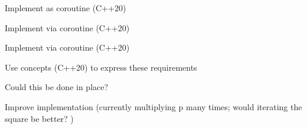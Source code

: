 
\begin{DoxyRefList}
\item[Class \mbox{\hyperlink{classsymmp_1_1FactoryGenerator}{Factory\+Generator$<$ spec\+\_\+t, gen\+\_\+t $>$}} ]\label{todo__todo000001}%
%
Implement as coroutine (C++20)  
\item[Class \mbox{\hyperlink{classsymmp_1_1PermutationGenerator}{Permutation\+Generator$<$ T $>$}} ]\label{todo__todo000002}%
%
Implement via coroutine (C++20)  
\item[Class \mbox{\hyperlink{classsymmp_1_1CombinationGenerator}{Combination\+Generator$<$ T $>$}} ]\label{todo__todo000003}%
%
Implement via coroutine (C++20)  
\item[Class \mbox{\hyperlink{classsymmp_1_1Polynomial}{Polynomial$<$ \+\_\+scl, \+\_\+exp, \+\_\+container, container\+\_\+is\+\_\+ordered, \+\_\+\+Args $>$}} ]\label{todo__todo000004}%
%
Use concepts (C++20) to express these requirements  
\item[Member \mbox{\hyperlink{classsymmp_1_1Polynomial_aa19a420790fbe79b9b73b503bf37bece}{Polynomial$<$ \+\_\+scl, \+\_\+exp, \+\_\+container, container\+\_\+is\+\_\+ordered, \+\_\+\+Args $>$\+::operator$\ast$=}} (const \mbox{\hyperlink{classsymmp_1_1Polynomial}{Polynomial}} \&other) -\/$>$ \mbox{\hyperlink{classsymmp_1_1Polynomial}{Polynomial}} \&]\label{todo__todo000005}%
%
Could this be done in place?  
\item[Member \mbox{\hyperlink{classsymmp_1_1Polynomial_a39143ef3ebb433a42659875d3b955daf}{Polynomial$<$ \+\_\+scl, \+\_\+exp, \+\_\+container, container\+\_\+is\+\_\+ordered, \+\_\+\+Args $>$\+::operator$^\wedge$}} (T p) const -\/$>$ \mbox{\hyperlink{classsymmp_1_1Polynomial}{Polynomial}}]\label{todo__todo000006}%
%
Improve implementation (currently multiplying p many times; would iterating the square be better? ) 
\end{DoxyRefList}
